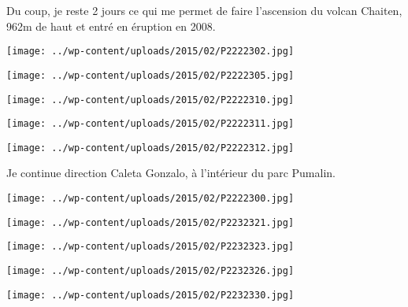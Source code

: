 \pagebreak
Du coup, je reste 2 jours ce qui me permet de faire l'ascension du volcan Chaiten, 962m de haut et entré en éruption en 2008.
\begin{center} \texttt{[image: ../wp-content/uploads/2015/02/P2222302.jpg]} \end{center}
\begin{center} \texttt{[image: ../wp-content/uploads/2015/02/P2222305.jpg]} \end{center}
\begin{center} \texttt{[image: ../wp-content/uploads/2015/02/P2222310.jpg]} \end{center}
\begin{center} \texttt{[image: ../wp-content/uploads/2015/02/P2222311.jpg]} \end{center}
\begin{center} \texttt{[image: ../wp-content/uploads/2015/02/P2222312.jpg]} \end{center}

Je continue direction Caleta Gonzalo, à l'intérieur du parc Pumalin.
\begin{center} \texttt{[image: ../wp-content/uploads/2015/02/P2222300.jpg]} \end{center}
\begin{center} \texttt{[image: ../wp-content/uploads/2015/02/P2232321.jpg]} \end{center}
\begin{center} \texttt{[image: ../wp-content/uploads/2015/02/P2232323.jpg]} \end{center}
\begin{center} \texttt{[image: ../wp-content/uploads/2015/02/P2232326.jpg]} \end{center}
\begin{center} \texttt{[image: ../wp-content/uploads/2015/02/P2232330.jpg]} \end{center}

